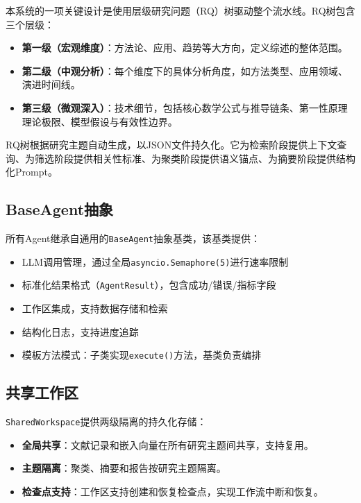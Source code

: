 本系统的一项关键设计是使用层级研究问题（RQ）树驱动整个流水线。RQ树包含三个层级：

\begin{itemize}
    \item \textbf{第一级（宏观维度）}：方法论、应用、趋势等大方向，定义综述的整体范围。
    \item \textbf{第二级（中观分析）}：每个维度下的具体分析角度，如方法类型、应用领域、演进时间线。
    \item \textbf{第三级（微观深入）}：技术细节，包括核心数学公式与推导链条、第一性原理理论极限、模型假设与有效性边界。
\end{itemize}

RQ树根据研究主题自动生成，以JSON文件持久化。它为检索阶段提供上下文查询、为筛选阶段提供相关性标准、为聚类阶段提供语义锚点、为摘要阶段提供结构化Prompt。

\subsection{BaseAgent抽象}

所有Agent继承自通用的\texttt{BaseAgent}抽象基类，该基类提供：
\begin{itemize}
    \item LLM调用管理，通过全局\texttt{asyncio.Semaphore(5)}进行速率限制
    \item 标准化结果格式（\texttt{AgentResult}），包含成功/错误/指标字段
    \item 工作区集成，支持数据存储和检索
    \item 结构化日志，支持进度追踪
    \item 模板方法模式：子类实现\texttt{execute()}方法，基类负责编排
\end{itemize}

\subsection{共享工作区}

\texttt{SharedWorkspace}提供两级隔离的持久化存储：
\begin{itemize}
    \item \textbf{全局共享}：文献记录和嵌入向量在所有研究主题间共享，支持复用。
    \item \textbf{主题隔离}：聚类、摘要和报告按研究主题隔离。
    \item \textbf{检查点支持}：工作区支持创建和恢复检查点，实现工作流中断和恢复。
\end{itemize}
